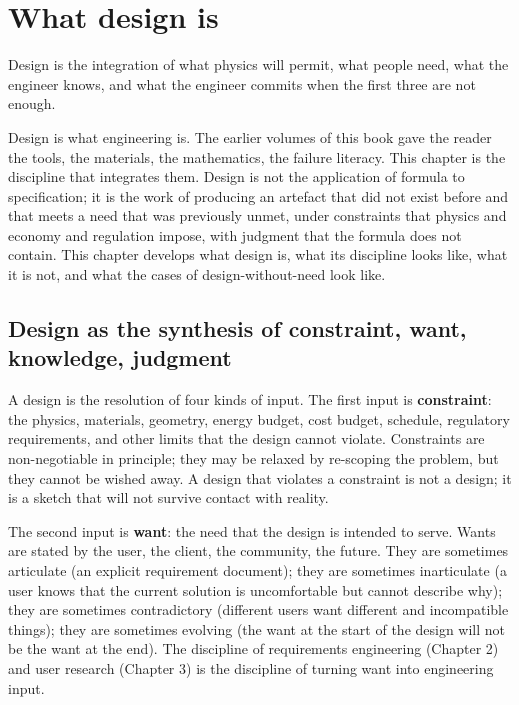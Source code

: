 \chapter{What design is}
\label{vol11:ch01}

\epigraph{Design is the integration of what physics will permit, what people need, what the engineer knows, and what the engineer commits when the first three are not enough.}{}


\noindent
Design is what engineering is. The earlier volumes of this book gave the reader the tools, the materials, the mathematics, the failure literacy. This chapter is the discipline that integrates them. Design is not the application of formula to specification; it is the work of producing an artefact that did not exist before and that meets a need that was previously unmet, under constraints that physics and economy and regulation impose, with judgment that the formula does not contain. This chapter develops what design is, what its discipline looks like, what it is not, and what the cases of design-without-need look like.

\section{Design as the synthesis of constraint, want, knowledge, judgment}

A design is the resolution of four kinds of input. The first input is \textbf{constraint}: the physics, materials, geometry, energy budget, cost budget, schedule, regulatory requirements, and other limits that the design cannot violate. Constraints are non-negotiable in principle; they may be relaxed by re-scoping the problem, but they cannot be wished away. A design that violates a constraint is not a design; it is a sketch that will not survive contact with reality.

The second input is \textbf{want}: the need that the design is intended to serve. Wants are stated by the user, the client, the community, the future. They are sometimes articulate (an explicit requirement document); they are sometimes inarticulate (a user knows that the current solution is uncomfortable but cannot describe why); they are sometimes contradictory (different users want different and incompatible things); they are sometimes evolving (the want at the start of the design will not be the want at the end). The discipline of requirements engineering (Chapter 2) and user research (Chapter 3) is the discipline of turning want into engineering input.

